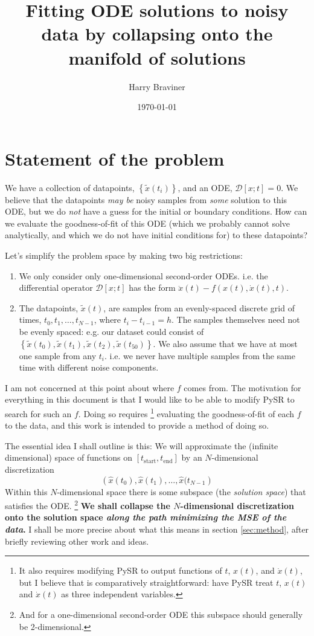 \documentclass{article}
\title{Fitting ODE solutions to noisy data by collapsing onto the manifold of solutions}
\author{Harry Braviner}
\date{\today}
\begin{document}
\maketitle

\section{Statement of the problem}

We have a collection of datapoints, $\left\{ \tilde{x}(t_i) \right\}$, and an ODE, $\mathcal{D}\left[ x; t \right] = 0$. We believe that the datapoints \emph{may be} noisy samples from \emph{some} solution to this ODE, but we do \emph{not} have a guess for the initial or boundary conditions. How can we evaluate the goodness-of-fit of this ODE (which we probably cannot solve analytically, and which we do not have initial conditions for) to these datapoints?

Let's simplify the problem space by making two big restrictions:
\begin{enumerate}
\item We only consider only one-dimensional second-order ODEs. i.e. the differential operator $\mathcal{D}\left[x ; t \right]$ has the form $\ddot{x}(t) - f\left(x(t), \dot{x}(t), t\right)$.
\item The datapoints, $\tilde{x}(t)$, are samples from an evenly-spaced discrete grid of times, $t_0, t_1, \dots, t_{N-1}$, where $t_i - t_{i-1} = h$. The samples themselves need not be evenly spaced: e.g. our dataset could consist of $\left\{\tilde{x}(t_0), \tilde{x}(t_1), \tilde{x}(t_2), \tilde{x}(t_{50})\right\}$. We also assume that we have at most one sample from any $t_i$. i.e. we never have multiple samples from the same time with different noise components.
\end{enumerate}

I am not concerned at this point about where $f$ comes from.
The motivation for everything in this document is that I would like to be able to modify PySR to search for such an $f$.
Doing so requires%
\footnote{It also requires modifying PySR to output functions of $t$, $x(t)$, and $\dot{x}(t)$, but I believe that is comparatively straightforward: have PySR treat $t$, $x(t)$ and $\dot{x}(t)$ as three independent variables.}
evaluating the goodness-of-fit of each $f$ to the data, and this work is intended to provide a method of doing so.

The essential idea I shall outline is this: We will approximate the (infinite dimensional) space of functions on $\left[t_{\mathrm{start}}, t_{\mathrm{end}} \right]$ by an $N$-dimensional discretization
$$
\left( \hat{x}(t_0), \hat{x}(t_1), \dots, \hat{x}(t_{N-1} \right)
$$
Within this $N$-dimensional space there is some subspace (the \emph{solution space}) that satisfies the ODE.%
\footnote{
And for a one-dimensional second-order ODE this subspace should generally be 2-dimensional.
}
\textbf{We shall collapse the $N$-dimensional discretization onto the solution space \emph{along the path minimizing the MSE of the data}.}
I shall be more precise about what this means in section \ref{sec:method}, after briefly reviewing other work and ideas.
\end{document}
